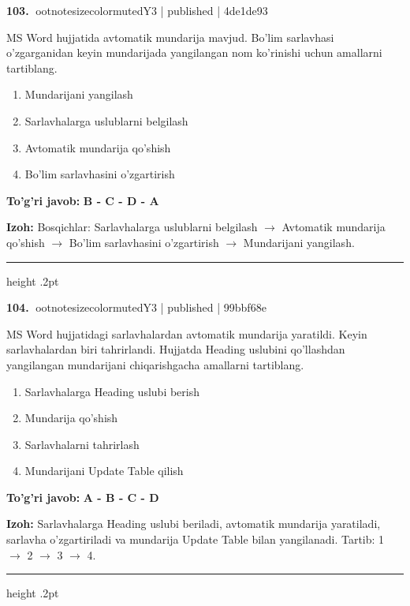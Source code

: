 \documentclass[10pt,a4paper]{article}
\begin{document}
\textbf{\color{ink}103.} {ootnotesizecolor{muted}Y3 | published | 4de1de93}
\par
MS Word hujjatida avtomatik mundarija mavjud. Bo'lim sarlavhasi o'zgarganidan keyin mundarijada yangilangan nom ko'rinishi uchun amallarni tartiblang.
\begin{enumerate}[label=\Alph*),leftmargin=9mm]
\item Mundarijani yangilash
\item Sarlavhalarga uslublarni belgilash
\item Avtomatik mundarija qo'shish
\item Bo'lim sarlavhasini o'zgartirish
\end{enumerate}
\begin{tcolorbox}[enhanced,breakable,colback=teal!4,colframe=teal!55!black,boxrule=0.45pt,arc=1.2mm,left=2.8mm,right=2.8mm,top=2mm,bottom=2mm]
\textbf{\color{teal}To'g'ri javob:} \textbf{B - C - D - A}
\par\smallskip
\textbf{Izoh:} Bosqichlar: Sarlavhalarga uslublarni belgilash \ensuremath{\rightarrow} Avtomatik mundarija qo'shish \ensuremath{\rightarrow} Bo'lim sarlavhasini o'zgartirish \ensuremath{\rightarrow} Mundarijani yangilash.
\end{tcolorbox}
\vspace{2mm}\hrule height .2pt\vspace{2mm}

\textbf{\color{ink}104.} {ootnotesizecolor{muted}Y3 | published | 99bbf68e}
\par
MS Word hujjatidagi sarlavhalardan avtomatik mundarija yaratildi. Keyin sarlavhalardan biri tahrirlandi. Hujjatda Heading uslubini qo'llashdan yangilangan mundarijani chiqarishgacha amallarni tartiblang.
\begin{enumerate}[label=\Alph*),leftmargin=9mm]
\item Sarlavhalarga Heading uslubi berish
\item Mundarija qo'shish
\item Sarlavhalarni tahrirlash
\item Mundarijani Update Table qilish
\end{enumerate}
\begin{tcolorbox}[enhanced,breakable,colback=teal!4,colframe=teal!55!black,boxrule=0.45pt,arc=1.2mm,left=2.8mm,right=2.8mm,top=2mm,bottom=2mm]
\textbf{\color{teal}To'g'ri javob:} \textbf{A - B - C - D}
\par\smallskip
\textbf{Izoh:} Sarlavhalarga Heading uslubi beriladi, avtomatik mundarija yaratiladi, sarlavha o'zgartiriladi va mundarija Update Table bilan yangilanadi. Tartib: 1 \ensuremath{\rightarrow} 2 \ensuremath{\rightarrow} 3 \ensuremath{\rightarrow} 4.
\end{tcolorbox}
\vspace{2mm}\hrule height .2pt\vspace{2mm}
\end{document}
